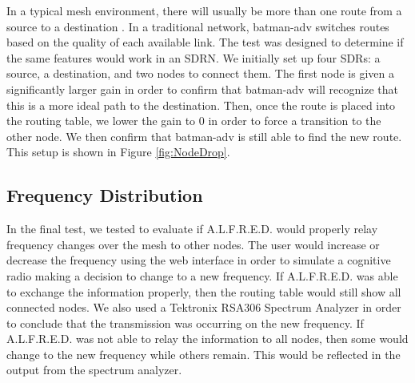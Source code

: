 In a typical mesh environment, there will usually be more than one route from a source to a destination \cite{Akyildiz2009810}. In a traditional network, batman-adv switches routes based on the quality of each available link. The test was designed to determine if the same features would work in an SDRN. We initially set up four SDRs: a source, a destination, and two nodes to connect them. The first node is given a significantly larger gain in order to confirm that batman-adv will recognize that this is a more ideal path to the destination. Then, once the route is placed into the routing table, we lower the gain to 0 in order to force a transition to the other node. We then confirm that batman-adv is still able to find the new route. This setup is shown in Figure \ref{fig:NodeDrop}.



\subsection{Frequency Distribution}

In the final test, we tested to evaluate if A.L.F.R.E.D. would properly relay frequency changes over the mesh to other nodes. The user would increase or decrease the frequency using the web interface in order to simulate a cognitive radio making a decision to change to a new frequency. If A.L.F.R.E.D. was able to exchange the information properly, then the routing table would still show all connected nodes. We also used a Tektronix RSA306 Spectrum Analyzer in order to conclude that the transmission was occurring on the new frequency. If A.L.F.R.E.D. was not able to relay the information to all nodes, then some would change to the new frequency while others remain. This would be reflected in the output from the spectrum analyzer. 




